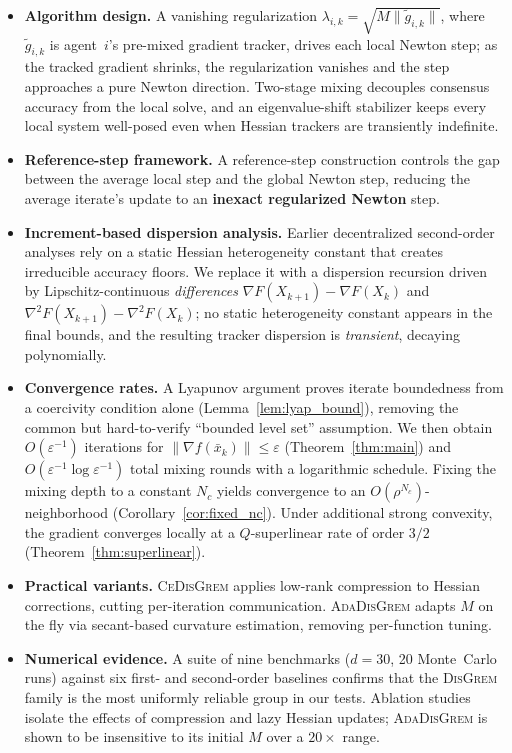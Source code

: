 \documentclass[11pt,a4paper]{article}
\def\cO{O}%
\newcommand{\cO}{\mathcal{O}}
\begin{document}
\begin{itemize}[leftmargin=1.2em,itemsep=2pt]
	\item \textbf{Algorithm design.}
	A vanishing regularization
	$\lambda_{i,k}=\sqrt{M\|\tilde g_{i,k}\|}$, where
	$\tilde g_{i,k}$ is agent~$i$'s pre-mixed gradient tracker,
	drives each local Newton step; as the tracked gradient shrinks,
	the regularization vanishes and the step approaches a pure
	Newton direction.
	Two-stage mixing decouples consensus accuracy from the local
	solve, and an eigenvalue-shift stabilizer keeps every local
	system well-posed even when Hessian trackers are transiently
	indefinite.
	
	\item \textbf{Reference-step framework.}
	A reference-step construction controls the gap between the
	average local step and the global Newton step, reducing the
	average iterate's update to an \textbf{inexact regularized Newton} step.
	
	\item \textbf{Increment-based dispersion analysis.}
	Earlier decentralized second-order analyses rely on a static
	Hessian heterogeneity constant that creates irreducible accuracy
	floors.
	We replace it with a dispersion recursion driven by
	Lipschitz-continuous \emph{differences}
	$\nabla F(X_{k+1}){-}\nabla F(X_k)$ and
	$\nabla^2 F(X_{k+1}){-}\nabla^2 F(X_k)$; no static
	heterogeneity constant appears in the final bounds, and
	the resulting tracker dispersion is \emph{transient},
	decaying polynomially.
	
	\item \textbf{Convergence rates.}
	A Lyapunov argument proves iterate boundedness from a coercivity
	condition alone (Lemma~\ref{lem:lyap_bound}), removing the
	common but hard-to-verify ``bounded level set'' assumption.
	We then obtain
	$\cO(\varepsilon^{-1})$ iterations for
	$\|\nabla f(\bar x_k)\|\le\varepsilon$
	(Theorem~\ref{thm:main})
	and $\cO(\varepsilon^{-1}\log\varepsilon^{-1})$ total mixing
	rounds with a logarithmic schedule.
	Fixing the mixing depth to a constant $N_c$ yields convergence
	to an $\cO(\rho^{N_c})$-neighborhood
	(Corollary~\ref{cor:fixed_nc}).
	Under additional strong convexity, the gradient converges
	locally at a $Q$-superlinear rate of order $3/2$
	(Theorem~\ref{thm:superlinear}).
	
	\item \textbf{Practical variants.}
	\textsc{CeDisGrem} applies low-rank compression to Hessian
	corrections, cutting per-iteration communication.
	\textsc{AdaDisGrem} adapts $M$ on the fly via secant-based
	curvature estimation, removing per-function tuning.
	
	\item \textbf{Numerical evidence.}
	A suite of nine benchmarks ($d{=}30$, 20 Monte~Carlo runs)
	against six first- and second-order baselines confirms that
	the \textsc{DisGrem} family is the most uniformly reliable
	group in our tests.
	Ablation studies isolate the effects of compression and lazy
	Hessian updates; \textsc{AdaDisGrem} is shown to be
	insensitive to its initial $M$ over a $20\times$ range.
\end{itemize}
\end{document}
